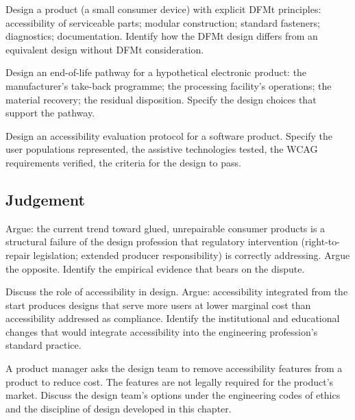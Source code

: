 \begin{exercise}
Design a product (a small consumer device) with explicit DFMt principles: accessibility of serviceable parts; modular construction; standard fasteners; diagnostics; documentation. Identify how the DFMt design differs from an equivalent design without DFMt consideration.
\end{exercise}

\begin{exercise}
Design an end-of-life pathway for a hypothetical electronic product: the manufacturer's take-back programme; the processing facility's operations; the material recovery; the residual disposition. Specify the design choices that support the pathway.
\end{exercise}

\begin{exercise}
Design an accessibility evaluation protocol for a software product. Specify the user populations represented, the assistive technologies tested, the WCAG requirements verified, the criteria for the design to pass.
\end{exercise}

\subsection*{Judgement}

\begin{exercise}
Argue: the current trend toward glued, unrepairable consumer products is a structural failure of the design profession that regulatory intervention (right-to-repair legislation; extended producer responsibility) is correctly addressing. Argue the opposite. Identify the empirical evidence that bears on the dispute.
\end{exercise}

\begin{exercise}
Discuss the role of accessibility in design. Argue: accessibility integrated from the start produces designs that serve more users at lower marginal cost than accessibility addressed as compliance. Identify the institutional and educational changes that would integrate accessibility into the engineering profession's standard practice.
\end{exercise}

\begin{exercise}
A product manager asks the design team to remove accessibility features from a product to reduce cost. The features are not legally required for the product's market. Discuss the design team's options under the engineering codes of ethics and the discipline of design developed in this chapter.
\end{exercise}


